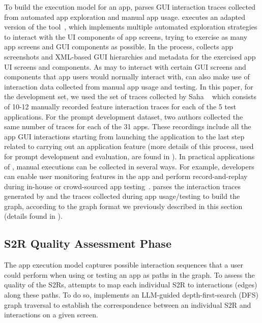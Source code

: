 To build the execution model for an app, \tool parses GUI interaction traces collected from automated app exploration and manual app usage.  \tool executes an adapted version of the \CrashScope tool~\cite{Moran2016, Moran2017}, which implements multiple
automated exploration strategies to interact with the UI components of app screens, trying to exercise as many app screens and GUI components as possible.
In the process, \CrashScope collects app screenshots and XML-based GUI hierarchies and metadata for the exercised app UI screens and components. 
As \CrashScope may  to interact with certain GUI screens and components that app users would normally interact with, \tool can also make use of interaction data collected from manual app usage and testing. 
In this paper, for the development set, we used the set of traces collected by Saha \etal~\cite{saha2024toward} which consists of 10-12 manually recorded feature interaction traces for each of the 5 test applications. For the prompt development dataset, two authors collected the same number of traces for each of the 31 apps. These recordings include all the app GUI interactions starting from launching the application to the last step related to carrying out an application feature (more details of this process, used for prompt development and evaluation, are found in ). 
In practical applications of \tool, manual executions can be collected in several ways.
For example, developers can enable user monitoring features in the app and perform record-and-replay during in-house or crowd-sourced app testing~\cite{du2022semcluster}. 
\tool parses the interaction traces generated by \CrashScope and the traces collected during app usage/testing to build the graph, according to the graph format we previously described in this section (details found in ). 
 
\subsection{S2R Quality Assessment Phase}
\label{sec:quality-assessment-annotations}

The app execution model captures possible interaction sequences that a user could perform when using or testing an app as paths in the graph. 
To assess the quality of the S2Rs, \tool attempts to map each individual S2R to interactions (\ie edges) along these paths. 
To do so, \tool implements an LLM-guided depth-first-search (DFS) graph traversal 
to establish the correspondence between an individual S2R and interactions on a given screen. 

